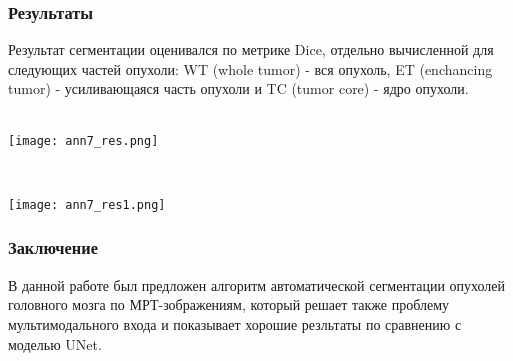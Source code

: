 \subsubsection*{Результаты}

Результат сегментации  оценивался по метрике Dice, отдельно вычисленной
для следующих частей опухоли: WT (whole tumor) -  вся опухоль, ET (enchancing tumor) - 
усиливающаяся часть опухоли и TC (tumor core) - ядро опухоли. \\
 \\
\begin{minipage}{1.0\linewidth}
    \begin{center}
        \texttt{[image: ann7\_res.png]} \\
    \end{center}
\end{minipage}
 \\
\begin{minipage}{1.0\linewidth}
    \begin{center}
        \texttt{[image: ann7\_res1.png]} \\
    \end{center}
\end{minipage}
\subsubsection*{Заключение}

В данной работе был предложен алгоритм автоматической сегментации 
опухолей головного мозга по МРТ-зображениям, который решает также проблему
мультимодального входа и показывает хорошие резльтаты по сравнению с моделью UNet.


